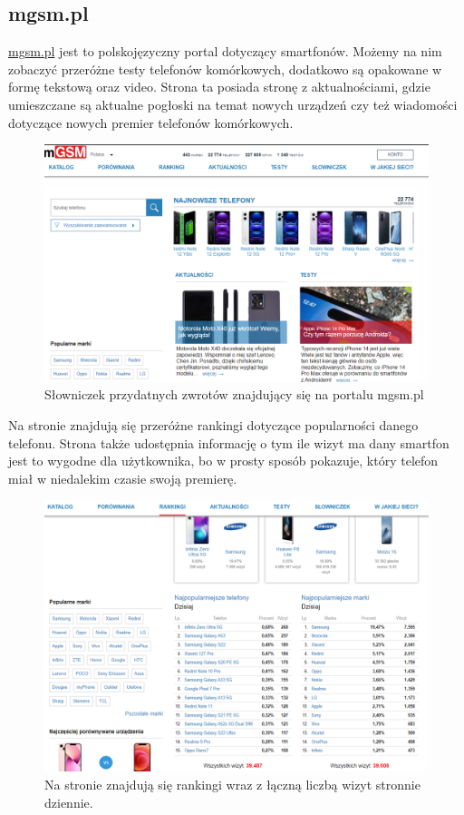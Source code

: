 \subsection{mgsm.pl}
\href{https://www.mgsm.pl/pl/}{mgsm.pl} \cite{mgsm} jest to polskojęzyczny portal dotyczący smartfonów. Możemy na nim zobaczyć przeróżne testy telefonów komórkowych, dodatkowo są opakowane w formę tekstową oraz video. Strona ta posiada stronę z aktualnościami, gdzie umieszczane są aktualne pogłoski na temat nowych urządzeń czy też wiadomości dotyczące nowych premier telefonów komórkowych.
\begin{figure}[H]
    \centering
    \includegraphics[width=15cm]{img/mgsm/mgsm.png}
    \caption{Słowniczek przydatnych zwrotów znajdujący się na portalu mgsm.pl}
    \label{mgsm}
\end{figure}
Na stronie znajdują się przeróżne rankingi dotyczące popularności danego telefonu. Strona także udostępnia informację o tym ile wizyt ma dany smartfon jest to wygodne dla użytkownika, bo w prosty sposób pokazuje, który telefon miał w niedalekim czasie swoją premierę.
\begin{figure}[H]
    \centering
    \includegraphics[width=15cm]{img/mgsm/rankingsMgsm.png}
    \caption{Na stronie znajdują się rankingi wraz z łączną liczbą wizyt stronnie dziennie.}
    \label{mgsm_1}
\end{figure}
